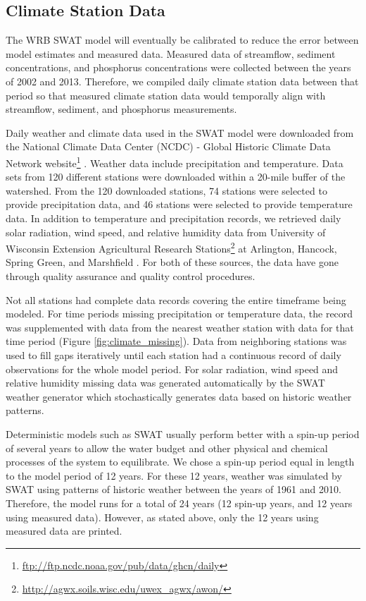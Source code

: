 \subsection{Climate Station Data}\label{sec:climate_data}

The WRB SWAT model will eventually be calibrated to reduce the error between
model estimates and measured data. Measured data of streamflow, sediment
concentrations, and phosphorus concentrations were collected between the years
of 2002 and 2013. Therefore, we compiled daily climate station data between that
period so that measured climate station data would temporally align with
streamflow, sediment, and phosphorus measurements.

Daily weather and climate data used in the SWAT model were downloaded from the
National Climate Data Center (NCDC) - Global Historic Climate Data Network
website\footnote{\url{ftp://ftp.ncdc.noaa.gov/pub/data/ghcn/daily}}
\citep{ncdc_ghcn_2012}.
Weather data include precipitation and temperature.
Data sets from 120 different stations were downloaded within a 20-mile buffer of
the watershed. From the 120 downloaded stations, 74 stations were selected to
provide precipitation data, and 46 stations were selected to provide temperature
data.
In addition to temperature and precipitation records, we retrieved daily solar
radiation, wind speed, and relative humidity data from University of Wisconsin
Extension Agricultural Research
Stations\footnote{\url{http://agwx.soils.wisc.edu/uwex_agwx/awon/}} at
Arlington, Hancock, Spring Green, and Marshfield .
For both of these sources, the data have gone through quality assurance and
quality control procedures.

Not all stations had complete data records covering the entire timeframe being
modeled.  For time periods missing precipitation or temperature data, the record
was supplemented with data from the nearest weather station with data for that
time period (Figure \ref{fig:climate_missing}). Data from neighboring stations
was used to fill gaps iteratively until each station had a continuous record of
daily observations for the whole model period. For solar radiation, wind speed
and relative humidity missing data was generated automatically by the SWAT
weather generator which stochastically generates data based on historic weather
patterns.

Deterministic models such as SWAT usually perform better with a spin-up period
of several years to allow the water budget and other physical and chemical
processes of the system to equilibrate. We chose a spin-up period equal in
length to the model period of 12 years. For these 12 years, weather was
simulated by SWAT using patterns of historic weather between the years of 1961
and 2010. Therefore, the model runs for a total of 24 years (12 spin-up years,
and 12 years using measured data). However, as stated above, only the 12 years
using measured data are printed.
